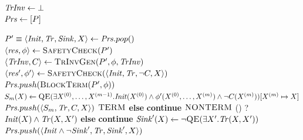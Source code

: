 \begin{algorithm}[t!]
	\SetInd{0.5em}{0.5em}
    \DontPrintSemicolon
    \small
    \newcommand{\Continue}{\textbf{continue}}
    \caption{Extended Interpolation-based Transition Invariant Generation for Proving and Disproving Termination.}
    \label{Alg:SNA_Refined}
    \Output{\TERM $\mid$ \NONTERM}
    $\mathit{TrInv} \gets \bot$ \\
    $\mathit{Prs} \gets [P]$ \label{SNA_Refined:Prs} \\
    \While{$\top$} {
        $P' \equiv \langle \mathit{Init}, \mathit{Tr}, \mathit{Sink}, X \rangle \gets \mathit{Prs}.pop()$ \label{SNA_Refined:Extension}\\
        \label{SNA_Refined:Safety} $\langle \mathit{res}, \phi \rangle \gets \textsc{SafetyCheck}(P')$ \\
        \eIf{$\res = \UNSAFE$} {
            $\langle \mathit{TrInv}, C \rangle \gets \textsc{TrInvGen}(P', \phi, \mathit{TrInv})$ \\
            \label{SNA_Refined:CheckNc} $\langle \mathit{res}', \phi' \rangle \gets \textsc{SafetyCheck}(\langle \mathit{Init}, \mathit{Tr}, \lnot C, X \rangle)$ \\
            {
                $\mathit{Prs}.push(\textsc{BlockTerm}(P', \phi))$ \label{SNA_Refined:BlockTerm}\\
                $S_m(X) \gets \textsc{QE}(\exists X^{(0)}, \ldots, X^{(m-1)}. \mathit{Init}(X^{(0)}) \land \phi'(X^{(0)}, \ldots, X^{(m)}) \land \lnot C(X^{(m)}))  [X^{(m)} \mapsto X]$ \label{SNA_Refined:Sm}\\
                $\mathit{Prs}.push(\langle S_m, \mathit{Tr}, C, X \rangle)$\label{SNA_Refined:PushNewProblem}
            }{
                \lIf {$\Prs = \emptyset$} {\Return $\TERM$\label{SNA_Refined:NEWTERM}}
                \textbf{else} \Continue
            } 
        }{
             {
                \Return $\textsc{NONTERM}$ \label{SNA_Refined:RECURRENT}
            } 
            \uIf(\label{SNA_Refined:TERM}) {\UNSAT{} ? $\mathit{Init}(X) \land \mathit{Tr}(X,X')$} {
                    \lIf{$\Prs = \emptyset$}{\Return $\TERM$ \label{SNA_Refined:TERMR}}
                    \textbf{else} \Continue
            } {
                $\mathit{Sink}'(X) \gets \lnot \textsc{QE}(\exists X'. \mathit{Tr}(X,X'))$ \label{SNA_Refined:Refinement} \\ 
                $\mathit{Prs}.push(\langle \mathit{Init} \land \lnot \mathit{Sink}', \mathit{Tr}, \mathit{Sink}', X \rangle)$ \label{SNA_Refined:NewPush}
            }
        }
        
    }
\end{algorithm}


